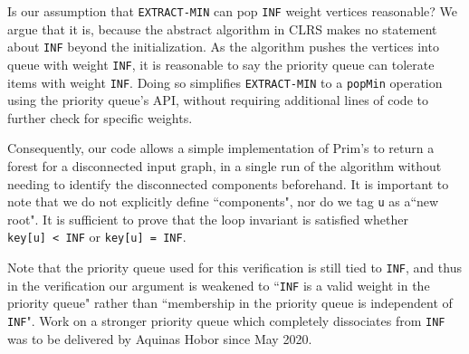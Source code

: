 {Is our assumption that \texttt{EXTRACT-MIN} can pop \texttt{INF} weight vertices reasonable? We argue that it is, because the abstract algorithm in CLRS makes no statement about \texttt{INF} beyond the initialization. As the algorithm pushes the vertices into queue with weight \texttt{INF}, it is reasonable to say the priority queue can tolerate items with weight \texttt{INF}. Doing so simplifies \texttt{EXTRACT-MIN} to a \texttt{popMin} operation using the priority queue's API, without requiring additional lines of code to further check for specific weights.

Consequently, our code allows a simple implementation of Prim's to return a forest for a disconnected input graph, in a single run of the algorithm without needing to identify the disconnected components beforehand. It is important to note that we do not explicitly define ``components", nor do we tag \texttt{u} as a``new root". It is sufficient to prove that the loop invariant is satisfied whether \texttt{key[u]~< INF} or \texttt{key[u] = INF}.

Note that the priority queue used for this verification is still tied to \texttt{INF}, and thus in the verification our argument is weakened to ``\texttt{INF} is a valid weight in the priority queue" rather than ``membership in the priority queue is independent of \texttt{INF}". Work on a stronger priority queue which completely dissociates from \texttt{INF} was to be delivered by Aquinas Hobor since May 2020.
}



